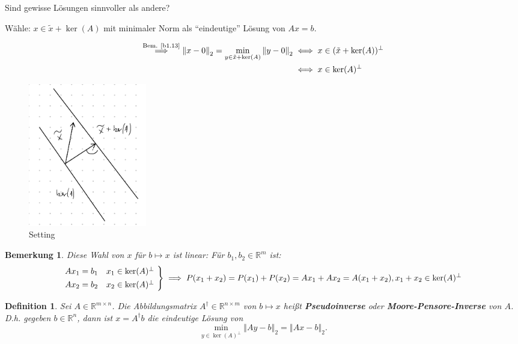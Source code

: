 \documentclass{book}
\newtheorem{definition}[algorithm]{Definition}
\newtheorem{remark}[algorithm]{Bemerkung}
\def\R{\mathbb{R}}
\begin{document}
        Sind gewisse Lösungen sinnvoller als andere?

        Wähle: $x\in\tilde{x}+\ker(A)$ mit minimaler Norm als ``eindeutige'' Lösung von $Ax=b$.

        \begin{align*}
            \stackrel{\text{Bem. \ref{b1.13}}}{\implies} \left\Vert x-0 \right\Vert_2 = \min_{y\in \tilde{x}+ \ker(A)} \left\Vert y-0 \right\Vert_2 &\iff x\in (\tilde{x}+\ker(A))^\perp \\
            &\iff x\in \ker(A)^\perp %
        \end{align*}
        
        \begin{figure}[H]
            \centering
            \includegraphics[width=0.25\textwidth]{Bild010}
            \caption{Setting}
        \end{figure}

        \begin{remark}\label{b2.21}
            Diese Wahl von $x$ für $b\mapsto x$ ist linear: Für $b_1,b_2\in\R^m$ ist:
            \[
            \begin{rcases*}
            Ax_1 = b_1 & $x_1 \in\text{ker}(A)^\perp$ \\
            Ax_2 = b_2 & $x_2 \in\text{ker}(A)^\perp$
            \end{rcases*} \implies P(x_1+x_2)=P(x_1)+P(x_2)=Ax_1+Ax_2=A(x_1+x_2),x_1+x_2\in \ker(A)^\perp
            \]
        \end{remark}

        \begin{definition}\label{d2.22}
            Sei $A\in\R^{m\times n}$. Die Abbildungsmatrix $A^\dagger\in\R^{n\times m}$ von $b\mapsto x$ heißt 
            \textbf{Pseudoinverse} oder \textbf{Moore-Pensore-Inverse} von $A$. D.h. gegeben $b\in\R^n$, dann ist $x=A^\dagger b$ die eindeutige Lösung von 
            \[
                \min_{y\in\ker(A)^\perp} \left\Vert Ay-b \right\Vert_2 = \left\Vert Ax-b \right\Vert_2.    
            \]
        \end{definition}
        
\end{document}
